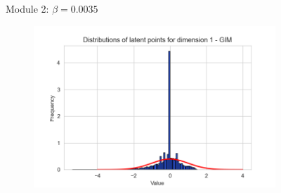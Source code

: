\begin{figure}[h]
\begin{subfigure}[b]{0.25\textwidth}
	\end{subfigure}
	\caption{Module 2: $\beta=0.0035$}
\end{figure}


\begin{figure}[h]
	\centering
	\begin{subfigure}[b]{0.25\textwidth}
		\centering
		\includegraphics[width=1\linewidth]{"graphs/distr/module1 kld0/_ distribution_latent_space_GIM_dim=0"}
		

\end{subfigure}
\end{figure}
